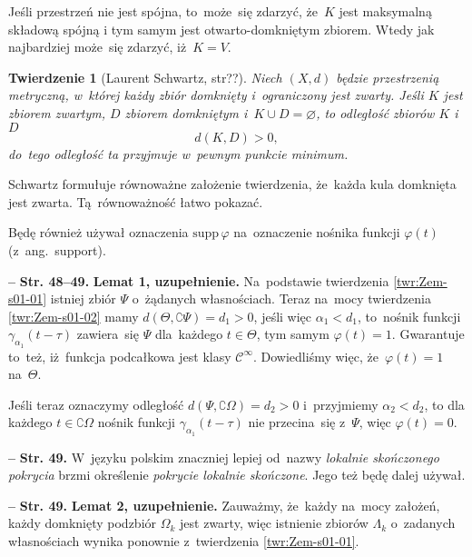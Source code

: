 \documentclass[a4paper,11pt]{article}
\newtheorem{twr}{Twierdzenie}
\let\emptyset\varnothing
\newcommand{\mr}{\mathrm}
\newcommand{\mc}{\mathcal}
\newcommand{\al}{\alpha}
\newcommand{\ga}{\gamma}
\newcommand{\La}{\Lambda}
\newcommand{\vp}{\varphi}
\newcommand{\Om}{\Omega}
\newcommand{\Cc}{\mc{C}}
\newcommand{\es}{\emptyset}
\newcommand{\com}{\complement}
\newcommand{\Cinfty}{\Cc^{ \infty }}
\newcommand{\supp}{\mr{supp}\,}
\newcommand{\tb}{\textbf}
\newcommand{\noi}{\noindent}
\newcommand{\start}{\noi \tb{--} {}}
\newcommand{\Str}[1]{\tb{Str. #1.}}
\newcommand{\vpt}{\vp( t )}
\begin{document}
Jeśli przestrzeń nie jest spójna, to~może~się zdarzyć, że~$K$ jest
maksymalną składową spójną i tym samym jest otwarto-domkniętym
zbiorem. Wtedy jak najbardziej może~się zdarzyć, iż~$K = V$.

\begin{twr}[Laurent Schwartz, str??\cite{Sch79}]
  \label{twr:Zem-s01-02}
  Niech $( X, d )$ będzie przestrzenią metryczną, w~której każdy zbiór
  domknięty i~ograniczony jest zwarty. Jeśli $K$ jest zbiorem zwartym,
  $D$ zbiorem domkniętym i~$K \cup D = \es$, to odległość zbiorów $K$
  i~$D$
  \begin{equation}
    \label{eq:Zem-s01-05}
    d( K, D ) > 0,
  \end{equation}
  do~tego odległość ta przyjmuje w~pewnym punkcie minimum.
\end{twr}
\noi Schwartz formułuje równoważne założenie twierdzenia, że~każda
kula domknięta jest zwarta. Tą~równoważność łatwo pokazać.

Będę również używał oznaczenia $\supp \vp$ na~oznaczenie nośnika
funkcji $\vpt$ (z~ang.~support).


\start \Str{48--49} \tb{Lemat 1, uzupełnienie.} Na~podstawie
twierdzenia \ref{twr:Zem-s01-01} istniej zbiór $\Psi$ o~żądanych
własnościach. Teraz na~mocy twierdzenia \eqref{twr:Zem-s01-02} mamy
$d( \Theta, \com \Psi ) = d_{ 1 } > 0$, jeśli więc
$\al_{ 1 } < d_{ 1 }$, to~nośnik funkcji
$\ga_{ \al_{ 1 } }( t - \tau )$ zawiera~się $\Psi$ dla~każdego
$t \in \Theta$, tym samym $\vp( t ) = 1$. Gwarantuje to~też,
iż~funkcja podcałkowa jest klasy $\Cinfty$. Dowiedliśmy więc,
że~$\vp( t ) = 1$ na~$\Theta$.

Jeśli teraz oznaczymy odległość $d( \Psi, \com \Om ) = d_{ 2 } > 0$
i~przyjmiemy $\al_{ 2 } < d_{ 2 }$, to dla każdego $t \in \com \Om$
nośnik funkcji $\ga_{ \al_{ 1 } }( t - \tau )$ nie przecina~się
z~$\Psi$, więc $\vpt = 0$.


\start \Str{49} W~języku polskim znaczniej lepiej od~nazwy
\emph{lokalnie skończonego pokrycia} brzmi określenie \emph{pokrycie
  lokalnie skończone}. Jego też będę dalej używał.


\start \Str{49} \tb{Lemat 2, uzupełnienie.} Zauważmy, że~każdy na~mocy
założeń, każdy domknięty podzbiór $\Om_{ k }$ jest zwarty, więc
istnienie zbiorów $\La_{ k }$ o~zadanych własnościach wynika ponownie
z~twierdzenia \eqref{twr:Zem-s01-01}.
\end{document}
